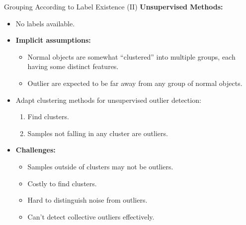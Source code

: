 \begin{frame}{Grouping According to Label Existence (II)}
	\textcolor{faugray}{\textbf{Unsupervised Methods:}}

	\begin{itemize}
		\item No labels available.
		\item \textbf{Implicit assumptions:}
		      \begin{itemize}
			      \item \textcolor{faugray}{Normal objects are somewhat ``clustered''} into multiple groups, each having some distinct features.
			      \item Outlier are expected to be far away from any group of normal objects.
		      \end{itemize}
		\item Adapt clustering methods for unsupervised outlier detection:
		      \begin{enumerate}
			      \item Find clusters.
			      \item Samples not falling in any cluster are outliers.
		      \end{enumerate}
		\item \textbf{Challenges:}
		      \begin{itemize}
			      \item Samples outside of clusters may not be outliers.
			      \item Costly to find clusters.
			      \item Hard to distinguish noise from outliers.
			      \item Can't detect collective outliers effectively.
		      \end{itemize}
	\end{itemize}
\end{frame}


